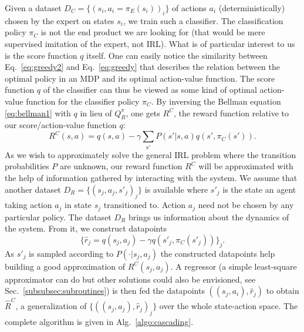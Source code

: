 \documentclass{llncs}
\begin{document}
Given a dataset $D_C = \{(s_i,a_i=\pi_E(s_i))_i\}$ of actions $a_i$ (deterministically) chosen by the expert on states $s_i$, we train such a classifier. The classification policy $\pi_C$ is not the end product we are looking for (that would be mere supervised imitation of the expert, not IRL). What is of particular interest to us is the score function $q$ itself. One can easily notice the similarity between Eq.~\eqref{eq:greedy2} and Eq.~\eqref{eq:greedy} that describes the relation between the optimal policy in an MDP and its optimal action-value function. The score function $q$ of the classifier can thus be viewed as some kind of optimal action-value function for the classifier policy $\pi_C$. By inversing the Bellman equation \eqref{eq:bellman1} with $q$ in lieu of $Q^\pi_R$, one gets $R^C$, the reward function relative to our score/action-value function $q$:
\begin{equation}
  \label{eq:rc}
  R^C(s,a) =q(s,a) -\gamma \sum_{\mathrm{s'}}P(s'|s,a)q(s',\pi_C(s')).
\end{equation}
As we wish to approximately solve the general IRL problem where the transition probabilities $P$ are unknown, our reward function $R^C$ will be approximated with the help of information gathered by interacting with the system. We assume that another dataset $D_R = \{(s_j,a_j,s'_j)_j\}$ is available where $s'_j$ is the state an agent taking action $a_j$ in state $s_j$ transitioned to. Action $a_j$ need not be chosen by any particular policy. The dataset $D_R$ brings us information about the dynamics of the system. From it, we construct datapoints
\begin{equation}
  \label{eq:rj}
  \{\hat r_j = q(s_j,a_j) - \gamma q(s'_j,\pi_C(s'_j))\}_j.
\end{equation}
As $s'_j$ is sampled according to $P(\cdot|s_j,a_j)$ the constructed datapoints help building a good approximation of $R^C(s_j,a_j)$. A regressor (a simple least-square approximator can do but other solutions could also be envisioned, see Sec.~\ref{subsubsec:subroutines}) is then fed the datapoints $((s_j,a_i),\hat r_j)$ to obtain $\hat R^C$, a generalization of $\{((s_j,a_j),\hat r_j)_j\}$ over the whole state-action space. The complete algorithm is given in Alg.~\ref{algo:cascading}.
\end{document}
